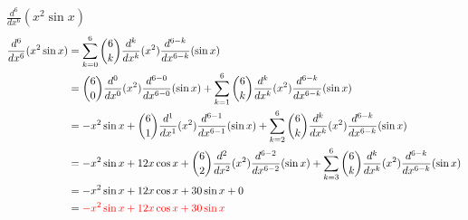 \item [3.] $\displaystyle \frac{d^{6}}{dx^{6}} (x^2 \sin{x})$
\begin{align*}
    \frac{d^{6}}{dx^{6}} (x^2 \sin{x})
    &= \sum_{k=0}^{6} \binom{6}{k}
    \frac{d^{k}}{dx^{k}} (x^2)
    \frac{d^{6-k}}{dx^{6-k}} (\sin{x})\\
    &= 
    \binom{6}{0}
    \frac{d^{0}}{dx^{0}} (x^2)
    \frac{d^{6-0}}{dx^{6-0}} (\sin{x})
    +
    \sum_{k=1}^{6} \binom{6}{k}
    \frac{d^{k}}{dx^{k}} (x^2)
    \frac{d^{6-k}}{dx^{6-k}} (\sin{x})\\
    &= 
    -x^2\sin{x}
    +
    \binom{6}{1}
    \frac{d^{1}}{dx^{1}} (x^2)
    \frac{d^{6-1}}{dx^{6-1}} (\sin{x})
    +
    \sum_{k=2}^{6} \binom{6}{k}
    \frac{d^{k}}{dx^{k}} (x^2)
    \frac{d^{6-k}}{dx^{6-k}} (\sin{x})\\
    &= 
    -x^2\sin{x}
    +
    12x\cos{x}
    +
    \binom{6}{2}
    \frac{d^{2}}{dx^{2}} (x^2)
    \frac{d^{6-2}}{dx^{6-2}} (\sin{x})
    +
    \sum_{k=3}^{6} \binom{6}{k}
    \frac{d^{k}}{dx^{k}} (x^2)
    \frac{d^{6-k}}{dx^{6-k}} (\sin{x})\\
    &= 
    -x^2\sin{x}
    +
    12x\cos{x}
    +
    30\sin{x}
    +
    0\\
    &= \textcolor{red}{-x^2\sin{x} + 12x\cos{x} + 30\sin{x}}
\end{align*}